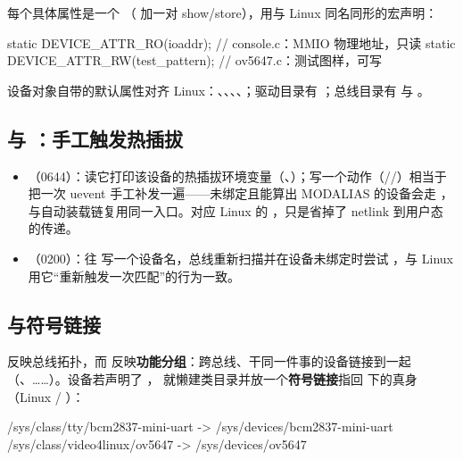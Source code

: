每个具体属性是一个 （ 加一对 show/store），用与 Linux 同名同形的宏声明：

\begin{ccode}
static DEVICE_ATTR_RO(ioaddr);        // console.c：MMIO 物理地址，只读
static DEVICE_ATTR_RW(test_pattern);  // ov5647.c：测试图样，可写
\end{ccode}

设备对象自带的默认属性对齐 Linux：、、、、；驱动目录有 ；总线目录有  与 。

\subsection{ 与 ：手工触发热插拔}

\begin{itemize}
  \item {}（0644）：读它打印该设备的热插拔环境变量（、）；写一个动作（//）相当于把一次 uevent 手工补发一遍——未绑定且能算出 MODALIAS 的设备会走 ，与自动装载链复用同一入口。对应 Linux 的 ，只是省掉了 netlink 到用户态  的传递。
  \item {}（0200）：往  写一个设备名，总线重新扫描并在设备未绑定时尝试 ，与 Linux 用它“重新触发一次匹配”的行为一致。
\end{itemize}

\subsection{ 与符号链接}

 反映总线拓扑，而  反映\textbf{功能分组}：跨总线、干同一件事的设备链接到一起（、……）。设备若声明了 ， 就懒建类目录并放一个\textbf{符号链接}指回  下的真身（Linux  / ）：

\begin{ccode}
/sys/class/tty/bcm2837-mini-uart  ->  /sys/devices/bcm2837-mini-uart
/sys/class/video4linux/ov5647     ->  /sys/devices/ov5647
\end{ccode}

